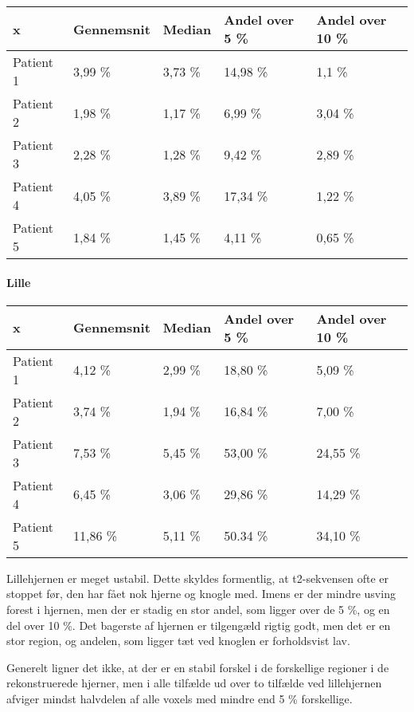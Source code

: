 \begin{center}
    \begin{tabular}{| l | l | l | l | l |}
    \hline
    x & Gennemsnit & Median & Andel over 5 \% & Andel over 10 \% \\ \hline
    Patient 1 & 3,99 \% & 3,73 \% & 14,98 \% & 1,1 \% \\ \hline
    Patient 2 & 1,98 \% & 1,17 \% & 6,99 \% & 3,04 \% \\ \hline
    Patient 3 & 2,28 \% & 1,28 \% & 9,42 \% & 2,89 \% \\ \hline
    Patient 4 & 4,05 \% & 3,89 \% & 17,34 \% & 1,22 \% \\ \hline
    Patient 5 & 1,84 \% & 1,45 \% & 4,11 \% & 0,65 \% \\ \hline
    \end{tabular}
\end{center}

\paragraph{Lille}

\begin{center}
    \begin{tabular}{| l | l | l | l | l |}
    \hline
    x & Gennemsnit & Median & Andel over 5 \% & Andel over 10 \% \\ \hline
    Patient 1 & 4,12 \% & 2,99 \% & 18,80 \% & 5,09 \% \\ \hline
    Patient 2 & 3,74 \% & 1,94 \% & 16,84 \% & 7,00 \% \\ \hline
    Patient 3 & 7,53 \% & 5,45 \% & 53,00 \% & 24,55 \% \\ \hline
    Patient 4 & 6,45 \% & 3,06 \% & 29,86 \% & 14,29 \% \\ \hline
    Patient 5 & 11,86 \% & 5,11 \% & 50.34 \% & 34,10 \% \\ \hline
    \end{tabular}
\end{center}

Lillehjernen er meget ustabil. Dette skyldes formentlig, at t2-sekvensen
ofte er stoppet før, den har fået nok hjerne og knogle med. Imens er der
mindre usving forest i hjernen, men der er stadig en stor andel, som
ligger over de 5 \%, og en del over 10 \%. Det bagerste af hjernen er
tilgengæld rigtig godt, men det er en stor region, og andelen, som ligger
tæt ved knoglen er forholdsvist lav.

Generelt ligner det ikke, at der er en stabil forskel i de forskellige
regioner i de rekonstruerede hjerner, men i alle tilfælde ud over to
tilfælde ved lillehjernen afviger mindst halvdelen af alle voxels med 
mindre end 5 \% forskellige.



